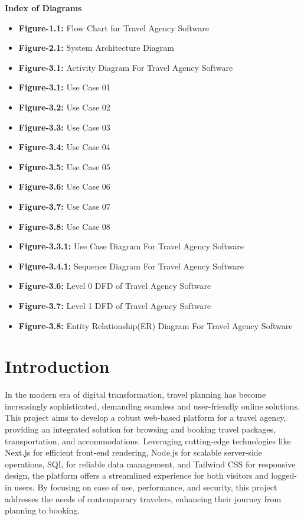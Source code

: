 \documentclass{scrreprt}
\begin{document}
\tableofcontents
\begin{center}
    \parbox{0.8\textwidth}{ 
        \centering
        \textbf{Index of Diagrams}
        
        \begin{itemize}
            \item \textbf{Figure-1.1:} Flow Chart for Travel Agency Software 
            \item \textbf{Figure-2.1:} System Architecture Diagram 
            \item \textbf{Figure-3.1:} Activity Diagram For Travel Agency Software 
            \item \textbf{Figure-3.1:} Use Case 01 
            \item \textbf{Figure-3.2:} Use Case 02 
            \item \textbf{Figure-3.3:} Use Case 03 
            \item \textbf{Figure-3.4:} Use Case 04 
            \item \textbf{Figure-3.5:} Use Case 05 
            \item \textbf{Figure-3.6:} Use Case 06 
            \item \textbf{Figure-3.7:} Use Case 07 
            \item \textbf{Figure-3.8:} Use Case 08 
            \item \textbf{Figure-3.3.1:} Use Case Diagram For Travel Agency Software 
            \item \textbf{Figure-3.4.1:} Sequence Diagram For Travel Agency Software 
            \item \textbf{Figure-3.6:} Level 0 DFD of Travel Agency Software 
            \item \textbf{Figure-3.7:} Level 1 DFD of Travel Agency Software 
            \item \textbf{Figure-3.8:} Entity Relationship(ER) Diagram For Travel Agency Software 
        \end{itemize}
    }
\end{center}

\chapter{Introduction}
In the modern era of digital transformation, travel planning has become increasingly sophisticated, demanding seamless and user-friendly online solutions. This project aims to develop a robust web-based platform for a travel agency, providing an integrated solution for browsing and booking travel packages, transportation, and accommodations. Leveraging cutting-edge technologies like Next.js for efficient front-end rendering, Node.js for scalable server-side operations, SQL for reliable data management, and Tailwind CSS for responsive design, the platform offers a streamlined experience for both visitors and logged-in users. By focusing on ease of use, performance, and security, this project addresses the needs of contemporary travelers, enhancing their journey from planning to booking.
\end{document}
